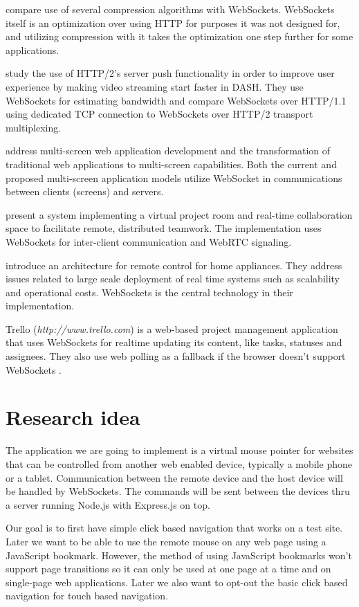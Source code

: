 \documentclass[12pt,a4paper,english,oneside]{article}
\begin{document}
\citet{compression} compare use of several compression algorithms with
WebSockets. WebSockets itself is an optimization over using HTTP for
purposes it was not designed for, and utilizing compression with it
takes the optimization one step further for some applications.

\citet{http2} study the use of HTTP/2's server push functionality in
order to improve user experience by making video streaming start
faster in DASH. They use WebSockets for estimating bandwidth and
compare WebSockets over HTTP/1.1 using dedicated TCP connection to
WebSockets over HTTP/2 transport multiplexing.

\citet{bassbouss} address multi-screen web application development and
the transformation of traditional web applications to multi-screen
capabilities. Both the current and proposed multi-screen application
models utilize WebSocket in communications between clients (screens)
and servers.

\citet{projectrooms} present a system implementing a virtual project
room and real-time collaboration space to facilitate remote,
distributed teamwork. The implementation uses WebSockets for
inter-client communication and WebRTC signaling.

\citet{homeappliances} introduce an architecture for remote control for
home appliances. They address issues related to large scale deployment
of real time systems such as scalability and operational
costs. WebSockets is the central technology in their implementation.

Trello (\emph{http://www.trello.com}) is a web-based project
management application that uses WebSockets for realtime updating its
content, like tasks, statuses and assignees. They also use web polling
as a fallback if the browser doesn't support WebSockets
\citep{trello}.

\section{Research idea}

The application we are going to implement is a virtual mouse pointer
for websites that can be controlled from another web enabled device,
typically a mobile phone or a tablet. Communication between the remote
device and the host device will be handled by WebSockets. The commands
will be sent between the devices thru a server running Node.js with
Express.js on top.

Our goal is to first have simple click based navigation that works on
a test site. Later we want to be able to use the remote mouse on any
web page using a JavaScript bookmark. However, the method of using
JavaScript bookmarks won't support page transitions so it can only be
used at one page at a time and on single-page web applications. Later
we also want to opt-out the basic click based navigation for touch
based navigation.
\end{document}
